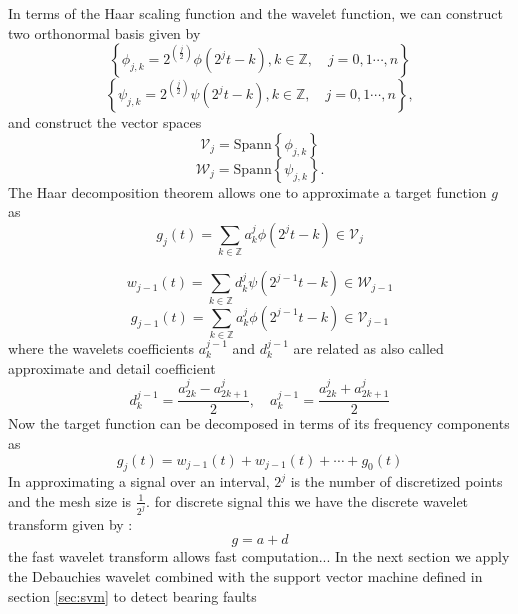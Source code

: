 \documentclass[../Main/thesis.tex]{subfiles}
\begin{document}
\justify
In terms of the Haar scaling function and the wavelet function, we can construct two orthonormal basis given by 
\begin{equation}\label{eq:basis-phi}
\left\{\phi_{j,k} = 2^{\left(\frac{j}{2}\right)}\phi\left( 2^{j}t-k \right), k\in\mathbb{Z}, \quad j = 0,1 \cdots,n  \right\}
\end{equation}
\justify
\begin{equation}\label{eq:basis.psi}
\left\{\psi_{j,k} = 2^{\left(\frac{j}{2}\right)}\psi\left( 2^{j}t-k \right), k\in\mathbb{Z}, \quad j = 0,1 \cdots,n \right\},
\end{equation}
and construct the vector spaces
\begin{equation}
\mathcal{V}_{j} = \text{Spann}\left\{ \phi_{j,k}  \right\}
\end{equation}
\begin{equation}
\mathcal{W}_{j} = \text{Spann}\left\{ \psi_{j,k}  \right\}.
\end{equation}
The Haar decomposition theorem allows one to approximate a target function $g$ as
\begin{equation}
g_{j}(t) = \sum_{k\in\mathbb{Z}}a_{k}^{j}\phi\left(  2^{j}t-k\right)\in \mathcal{V}_{j}
\end{equation} 

\begin{equation}
w_{j-1}(t) = \sum_{k\in\mathbb{Z}}d_{k}^{j}\psi\left(2^{j-1}t-k\right)\in\mathcal{W}_{j-1}
\end{equation}
\begin{equation}
g_{j-1}(t) = \sum_{k\in\mathbb{Z}}a_{k}^{j}\phi\left(2^{j-1}t-k\right)\in\mathcal{V}_{j-1}
\end{equation}
where the wavelets coefficients $a_{k}^{j-1}$ and $d_{k}^{j-1}$ are related as also called approximate and detail coefficient 
\begin{equation}
d_{k}^{j-1} = \frac{a_{2k}^{j}-a_{2k+1}^{j}}{2}, \quad a_{k}^{j-1} = \frac{a_{2k}^{j}+a_{2k+1}^{j}}{2}
\end{equation}
Now the target function can be decomposed in terms of its frequency components as 
\begin{equation}
g_{j}(t) = w_{j-1}(t) +  w_{j-1}(t)+\cdots + g_{0}(t)
\end{equation}
In approximating a signal over an interval, $2^{j}$ is the number of discretized points and the mesh size is $\frac{1}{2^{j}}$. 
for discrete signal this we have the discrete wavelet transform given by :
\begin{equation}
g = a + d
\end{equation}
the fast wavelet transform allows fast computation...
In the next section we apply the Debauchies wavelet combined with the support vector machine defined in section \ref{sec:svm} to detect bearing faults
\clearpage
\end{document}
